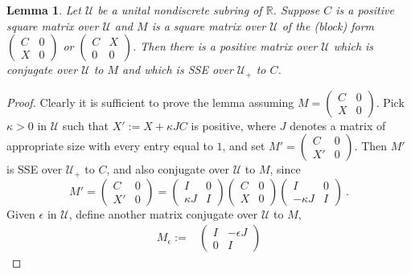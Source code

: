 \documentclass{amsart}
\newtheorem{lemma}[theorem]{Lemma}
\theoremstyle{definition}
\theoremstyle{remark}
\numberwithin{equation}{section}
\begin{document}
{{\begin{lemma} \label{laststep} 
Let $\mathcal U$ be a unital nondiscrete subring of $\mathbb R$. 
Suppose $C$ is a positive square matrix over $\mathcal U$ and
 $M$ is a square matrix over $\mathcal U$ of 
the (block) form 
$\left(\begin{smallmatrix} C & 0 \\ X& 0 
\end{smallmatrix}\right)$
or 
$\left(\begin{smallmatrix} C & X \\ 0& 0 
\end{smallmatrix}\right)$. 
Then there is a positive matrix over $\mathcal U$ which is conjugate over $\mathcal U$ 
to $M$ and which is SSE over $\mathcal U_+$ to $C$. 
\end{lemma} 
\begin{proof} 
Clearly it is sufficient to prove the lemma assuming  
$M=\left(\begin{smallmatrix} C & 0 \\ X& 0 
\end{smallmatrix}\right)$. 
Pick $\kappa > 0$ in $\mathcal U$ such that 
$X':=X+\kappa JC$ is positive, where $J$ denotes a 
matrix of appropriate size with every entry equal to $1$, 
and set 
$M'=\left(\begin{smallmatrix} C & 0 \\ X'& 0 
\end{smallmatrix}\right)$. 
Then $M'$ is SSE over $\mathcal U_+$ to $C$, and also conjugate over 
$\mathcal U$ to $M$, since 
\[
M' = 
\begin{pmatrix} C & 0 \\ X' & 0 \end{pmatrix} 
= 
\begin{pmatrix} I & 0 \\ \kappa J & I \end{pmatrix} 
\begin{pmatrix} C & 0 \\ X & 0 \end{pmatrix} 
\begin{pmatrix} I & 0 \\ -\kappa J & I \end{pmatrix} \ . 
\] 
Given $\epsilon $ in $\mathcal U$, define another matrix conjugate 
over $\mathcal U$ to $M$, 
\begin{align*} 
M_{\epsilon} := & 
\begin{pmatrix} I & -\epsilon J \\ 0 & I \end{pmatrix} 

\end{align*}
\end{proof}}}
\end{document}
